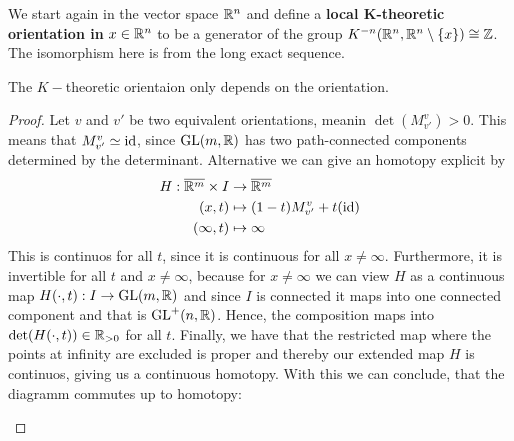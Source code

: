 \begin{definition}
	We start again in the vector space $\mathbb{R}^n$ and define a \textbf{local K-theoretic orientation in }$x\in \mathbb{R}^n$ to be a generator of the group $K^{-n}(\mathbb{R}^n,\mathbb{R}^n\setminus \{x\})\cong \mathbb{Z}$. The isomorphism here is from the long exact sequence.  
\end{definition}
\begin{remark} \label{rem: K-orientaion only depends on the orientation}
    The $K-$theoretic orientaion only depends on the orientation.
\end{remark}
\begin{proof}
Let $v$ and $v'$ be two equivalent orientations, meanin $\det(M^v_{v'})>0$. This means that $M^v_{v'}\simeq \operatorname{\mathrm{id}}$, since $\mathrm{GL}(m, \mathbb{R})$ has two path-connected components determined by the determinant. Alternative we can give an homotopy explicit by 
\begin{align*}
    H: \overline{\mathbb{R}^m}\times I & \to        \overline{\mathbb{R}^m}\\
    (x,t)                      & \mapsto    (1-t)M^v_{v'}+t(\operatorname{\mathrm{id}}) \\
    (\infty,t)                 & \mapsto \infty
\end{align*}
This is continuos for all $t$, since it is continuous for all $x\neq \infty$. Furthermore, it is invertible for all $t$ and $x\neq \infty$, because for $x\neq \infty $ we can view $H$ as a continuous map $H(\cdot,t):I\to \mathrm{GL}(m, \mathbb{R})$ and since $I$ is connected it maps into one connected component and that is $\mathrm{GL}^+(n,\mathbb{R})$. Hence, the composition maps into $\det(H(\cdot,t))\in \mathbb{R}_{>0}$ for all $t$. Finally, we have that the restricted map where the points at infinity are excluded is proper and thereby our extended map $H$ is continuos, giving us a continuous homotopy. With this we can conclude, that the diagramm commutes up to homotopy:
\begin{center}
\end{center}
\end{proof}
